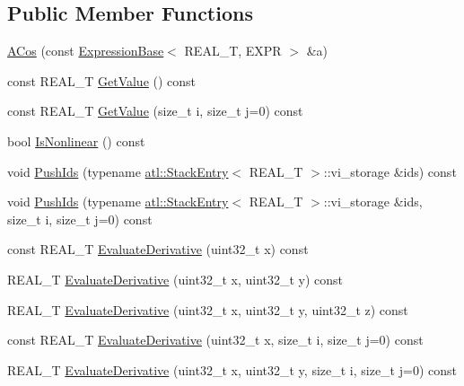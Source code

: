 \subsection*{Public Member Functions}
\begin{DoxyCompactItemize}
\item 
\hyperlink{structatl_1_1_a_cos_a574a9a5304ad7c90f7d2add7308a9510}{A\+Cos} (const \hyperlink{structatl_1_1_expression_base}{Expression\+Base}$<$ R\+E\+A\+L\+\_\+\+T, E\+X\+P\+R $>$ \&a)
\item 
const R\+E\+A\+L\+\_\+\+T \hyperlink{structatl_1_1_a_cos_ac88f1dd97b4cbccd7c40fb64efc57d3f}{Get\+Value} () const 
\item 
const R\+E\+A\+L\+\_\+\+T \hyperlink{structatl_1_1_a_cos_a444e9df0f5b21063bd332da73de6f23e}{Get\+Value} (size\+\_\+t i, size\+\_\+t j=0) const 
\item 
bool \hyperlink{structatl_1_1_a_cos_a8e94e5f51f01a559ea190d6fca8922e4}{Is\+Nonlinear} () const 
\item 
void \hyperlink{structatl_1_1_a_cos_a7c76416ec36329542e9fa9c8e61648c6}{Push\+Ids} (typename \hyperlink{structatl_1_1_stack_entry}{atl\+::\+Stack\+Entry}$<$ R\+E\+A\+L\+\_\+\+T $>$\+::vi\+\_\+storage \&ids) const 
\item 
void \hyperlink{structatl_1_1_a_cos_a5b882d4d0b3c5cd7195edc560cea5072}{Push\+Ids} (typename \hyperlink{structatl_1_1_stack_entry}{atl\+::\+Stack\+Entry}$<$ R\+E\+A\+L\+\_\+\+T $>$\+::vi\+\_\+storage \&ids, size\+\_\+t i, size\+\_\+t j=0) const 
\item 
const R\+E\+A\+L\+\_\+\+T \hyperlink{structatl_1_1_a_cos_a7df2e12cd867281e733d666097f576e3}{Evaluate\+Derivative} (uint32\+\_\+t x) const 
\item 
R\+E\+A\+L\+\_\+\+T \hyperlink{structatl_1_1_a_cos_a571db69e6082a154290e6aa4429ea8e3}{Evaluate\+Derivative} (uint32\+\_\+t x, uint32\+\_\+t y) const 
\item 
R\+E\+A\+L\+\_\+\+T \hyperlink{structatl_1_1_a_cos_a1080f087105145eeb86dbe4243108361}{Evaluate\+Derivative} (uint32\+\_\+t x, uint32\+\_\+t y, uint32\+\_\+t z) const 
\item 
const R\+E\+A\+L\+\_\+\+T \hyperlink{structatl_1_1_a_cos_a0b7efe188204ec1229c1849650d3b5c0}{Evaluate\+Derivative} (uint32\+\_\+t x, size\+\_\+t i, size\+\_\+t j=0) const 
\item 
R\+E\+A\+L\+\_\+\+T \hyperlink{structatl_1_1_a_cos_a03c9ced1e800232f5c0ee14c1ca61c89}{Evaluate\+Derivative} (uint32\+\_\+t x, uint32\+\_\+t y, size\+\_\+t i, size\+\_\+t j=0) const 
\item 

\end{DoxyCompactItemize}
